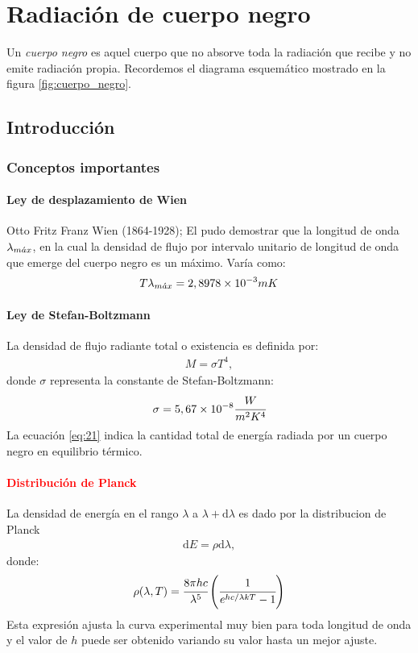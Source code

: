 \documentclass[../main]{subfiles}
\begin{document}
\chapter{Radiación de cuerpo negro}
Un \textit{cuerpo negro} es aquel cuerpo que no absorve toda la radiación que recibe y no emite radiación propia.
Recordemos el diagrama esquemático mostrado en la figura \ref{fig:cuerpo_negro}.
\section{Introducción}
\subsection{Conceptos importantes}
\begin{multicols}{2}
\subsubsection{Ley de desplazamiento de Wien}
Otto Fritz Franz Wien (1864-1928); El pudo demostrar que la longitud de onda $\lambda_{m\Acute{a}x}$, en la cual la densidad de flujo por intervalo unitario de longitud de onda que emerge del cuerpo negro es un máximo. Varía como:
\begin{align}
    T\lambda_{m\Acute{a}x}=2,8978\times 10^{-3} mK
\end{align}

\subsubsection{Ley de Stefan-Boltzmann}
La densidad de flujo radiante total o existencia es definida por:
\begin{align}
    M=\sigma T^4, \label{eq:21}
\end{align}
donde $\sigma$ representa la constante de Stefan-Boltzmann:
\begin{align}
    \sigma = 5,67 \times 10^{-8} \cfrac{W}{m^2K^4}
\end{align}
La ecuación \ref{eq:21} indica la cantidad total de energía radiada por un cuerpo negro en equilibrio térmico.

\subsubsection{\textcolor{red}{Distribución de Planck}}
La densidad de energía en el rango $\lambda$ a $\lambda+\text{d}\lambda$ es dado por la distribucion de Planck
\begin{align}
    \text{d}E=\rho\text{d}\lambda, \label{eq:22}
\end{align}
donde:
\begin{align}
    \rho(\lambda, T)= \cfrac{8\pi hc}{\lambda^5} \left(\cfrac{1}{e^{hc/\lambda kT}-1}\right)
\end{align}
Esta expresión ajusta la curva experimental muy bien para toda longitud de onda y el valor de $h$ puede ser obtenido variando su valor hasta un mejor ajuste.


\end{multicols}
\end{document}
